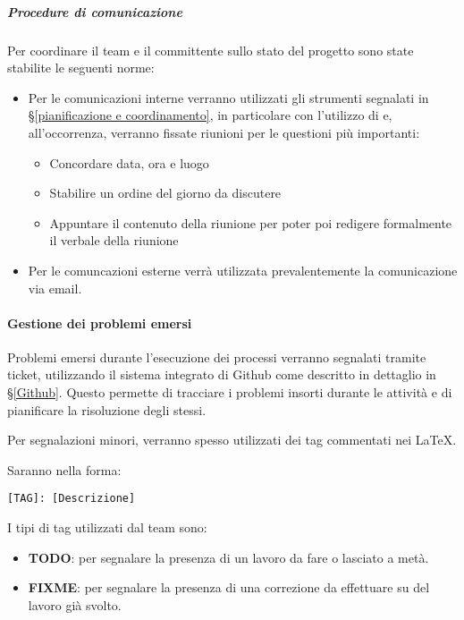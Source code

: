 			\subparagraph{Procedure di comunicazione}
			Per coordinare il team e il committente sullo stato del progetto sono state stabilite le seguenti norme:
			\begin{itemize}
				\item Per le comunicazioni interne verranno utilizzati gli strumenti segnalati in \S\ref{pianificazione e coordinamento}, in particolare
					con l'utilizzo di  e, all'occorrenza, verranno fissate riunioni per le questioni più importanti:
					\begin{itemize}
						\item Concordare data, ora e luogo
						\item Stabilire un ordine del giorno da discutere
						\item Appuntare il contenuto della riunione per poter poi redigere formalmente il verbale della riunione
					\end{itemize}
				\item Per le comuncazioni esterne verrà utilizzata prevalentemente la comunicazione via email. %
			\end{itemize}


    		\paragraph{Gestione dei problemi emersi}
			Problemi emersi durante l'esecuzione dei processi verranno segnalati tramite ticket, utilizzando il sistema integrato di Github come descritto
			in dettaglio in \S\ref{Github}. Questo permette di tracciare i problemi insorti durante le attività e di pianificare la risoluzione degli stessi.

			Per segnalazioni minori, verranno spesso utilizzati dei tag commentati nei  \LaTeX.
			\begin{samepage}
				Saranno nella forma:
				\begin{center}
					\texttt{[TAG]: [Descrizione]}
				\end{center}
			\end{samepage}
			I tipi di tag utilizzati dal team sono:
			\begin{itemize}
				\item \textbf{TODO}: per segnalare la presenza di un lavoro da fare o lasciato a metà.
				\item \textbf{FIXME}: per segnalare la presenza di una correzione da effettuare su del lavoro già svolto.
			\end{itemize}
		
